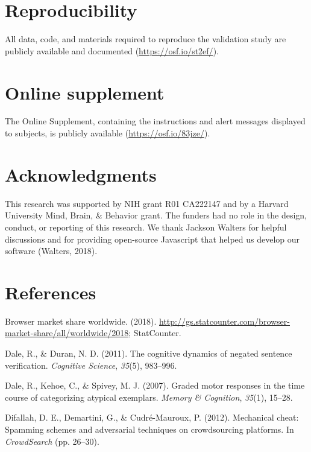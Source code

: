 \documentclass[]{article}
\begin{document}
\section{Reproducibility}

All data, code, and materials required to reproduce the validation study
are publicly available and documented (\url{https://osf.io/st2ef/}).

\section{Online supplement}

The Online Supplement, containing the instructions and alert messages
displayed to subjects, is publicly available
(\url{https://osf.io/83jze/}).

\section{Acknowledgments}

This research was supported by NIH grant R01 CA222147 and by a Harvard
University Mind, Brain, \& Behavior grant. The funders had no role in
the design, conduct, or reporting of this research. We thank Jackson
Walters for helpful discussions and for providing open-source Javascript
that helped us develop our software (Walters, 2018).

\newpage

\section*{References}

\hypertarget{refs}{}
\hypertarget{ref-browsers}{}
Browser market share worldwide. (2018).
\url{http://gs.statcounter.com/browser-market-share/all/worldwide/2018};
StatCounter.

\hypertarget{ref-dale_negated}{}
Dale, R., \& Duran, N. D. (2011). The cognitive dynamics of negated
sentence verification. \emph{Cognitive Science}, \emph{35}(5), 983--996.

\hypertarget{ref-dale_graded}{}
Dale, R., Kehoe, C., \& Spivey, M. J. (2007). Graded motor responses in
the time course of categorizing atypical exemplars. \emph{Memory \&
Cognition}, \emph{35}(1), 15--28.

\hypertarget{ref-difallah}{}
Difallah, D. E., Demartini, G., \& Cudré-Mauroux, P. (2012). Mechanical
cheat: Spamming schemes and adversarial techniques on crowdsourcing
platforms. In \emph{CrowdSearch} (pp. 26--30).
\end{document}
